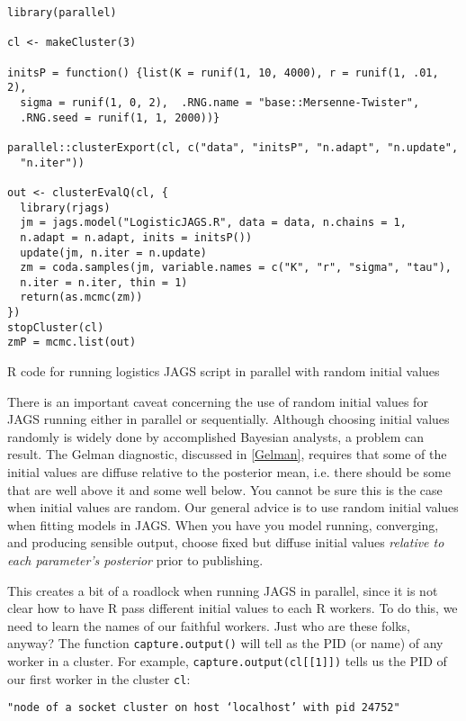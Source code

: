 \documentclass[12pt,english]{article}
\begin{document}
\begin{algorithm}
\begin{Verbatim}[frame=single]
library(parallel)

cl <- makeCluster(3)

initsP = function() {list(K = runif(1, 10, 4000), r = runif(1, .01, 2), 
  sigma = runif(1, 0, 2),  .RNG.name = "base::Mersenne-Twister", 
  .RNG.seed = runif(1, 1, 2000))}

parallel::clusterExport(cl, c("data", "initsP", "n.adapt", "n.update", 
  "n.iter"))

out <- clusterEvalQ(cl, {
  library(rjags)
  jm = jags.model("LogisticJAGS.R", data = data, n.chains = 1, 
  n.adapt = n.adapt, inits = initsP())
  update(jm, n.iter = n.update)
  zm = coda.samples(jm, variable.names = c("K", "r", "sigma", "tau"), 
  n.iter = n.iter, thin = 1)
  return(as.mcmc(zm))
}) 
stopCluster(cl)
zmP = mcmc.list(out)
\end{Verbatim}
\caption{R code for running logistics JAGS script in parallel with random initial values}
\label{alg:R code for parallel jags run}
\end{algorithm}

There is an important caveat concerning the use of random initial values for JAGS running either in parallel or sequentially.  Although choosing initial values randomly is widely done by accomplished Bayesian analysts, a problem can result. The Gelman diagnostic, discussed in \ref{Gelman}, requires that some of the initial values are diffuse relative to the posterior mean, i.e. there should be some that are well above it and some well below.  You cannot be sure this is the case when initial values are random. Our general advice is to use random initial values when fitting models in JAGS. When you have you model running, converging, and producing sensible output, choose fixed but diffuse initial values \textit{relative to each parameter's posterior} prior to publishing.

This creates a bit of a roadlock when running JAGS in parallel, since it is not clear how to have R pass different initial values to each R workers. To do this, we need to learn the names of our faithful workers. Just who are these folks, anyway? The function \texttt{capture.output()} will tell as the PID (or name) of any worker in a cluster. For example, \texttt{capture.output(cl[[1]])} tells us the PID of our first worker in the cluster \texttt{cl}:

\begin{Verbatim}[fontsize=\small]
"node of a socket cluster on host ‘localhost’ with pid 24752"
\end{Verbatim}
\end{document}
